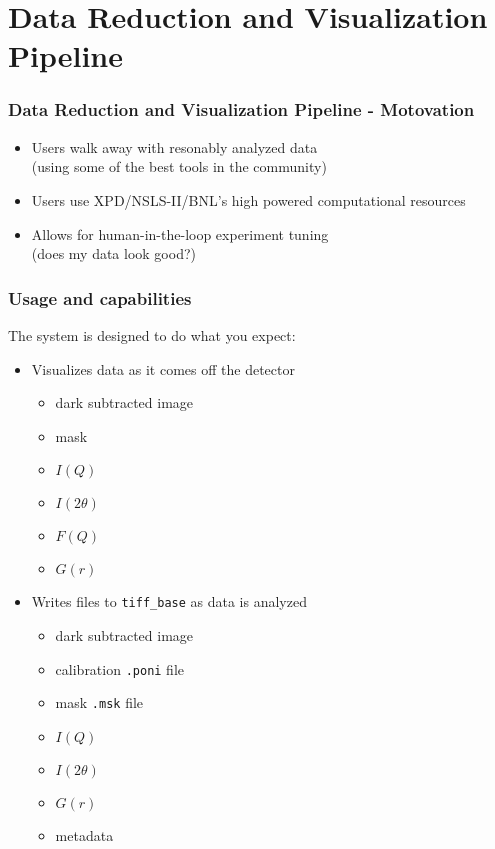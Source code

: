 \documentclass{beamer}
\begin{document}
\section{Data Reduction and Visualization Pipeline}

\begin{frame}
\frametitle{Data Reduction and Visualization Pipeline - Motovation}

\begin{itemize}
\item Users walk away with resonably analyzed data \\
(using some of the best tools in the community)
\item Users use XPD/NSLS-II/BNL's high powered computational resources
\item Allows for human-in-the-loop experiment tuning \\
(does my data look good?)
\end{itemize}

\end{frame}

\begin{frame}
\frametitle{Usage and capabilities}
The system is designed to do what you expect:

\begin{itemize}
\item Visualizes data as it comes off the detector
    \begin{itemize}
    \item dark subtracted image
    \item mask
    \item $I(Q)$
    \item $I(2\theta)$
    \item $F(Q)$
    \item $G(r)$
    \end{itemize}
\item Writes files to \texttt{tiff\_base} as data is analyzed
    \begin{itemize}
    \item dark subtracted image
    \item calibration \texttt{.poni} file
    \item mask \texttt{.msk} file
    \item $I(Q)$
    \item $I(2\theta)$
    \item $G(r)$
    \item metadata
    \end{itemize}
\end{itemize}
\end{frame}
\end{document}
